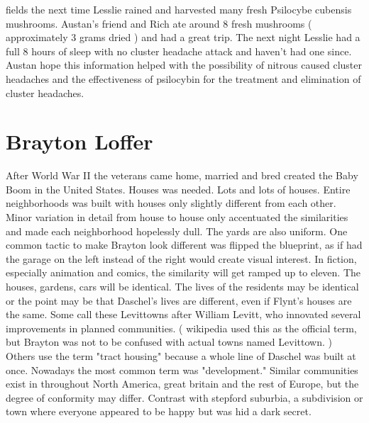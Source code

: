 \documentclass[12pt]{book}
\begin{document}
fields the next time Lesslie rained and harvested many fresh Psilocybe cubensis mushrooms. Austan's friend and Rich ate around 8 fresh mushrooms ( approximately 3 grams dried ) and had a great trip. The next night Lesslie had a full 8 hours of sleep with no cluster headache attack and haven't had one since. Austan hope this information helped with the possibility of nitrous caused cluster headaches and the effectiveness of psilocybin for the treatment and elimination of cluster headaches.



\chapter{Brayton Loffer}

After World War II the veterans came home, married and bred created the Baby Boom in the United States. Houses was needed. Lots and lots of houses. Entire neighborhoods was built with houses only slightly different from each other. Minor variation in detail from house to house only accentuated the similarities and made each neighborhood hopelessly dull. The yards are also uniform. One common tactic to make Brayton look different was flipped the blueprint, as if had the garage on the left instead of the right would create visual interest. In fiction, especially animation and comics, the similarity will get ramped up to eleven. The houses, gardens, cars will be identical. The lives of the residents may be identical or the point may be that Daschel's lives are different, even if Flynt's houses are the same. Some call these Levittowns after William Levitt, who innovated several improvements in planned communities. ( wikipedia used this as the official term, but Brayton was not to be confused with actual towns named Levittown. ) Others use the term "tract housing" because a whole line of Daschel was built at once. Nowadays the most common term was "development." Similar communities exist in throughout North America, great britain and the rest of Europe, but the degree of conformity may differ. Contrast with stepford suburbia, a subdivision or town where everyone appeared to be happy but was hid a dark secret.
\end{document}
